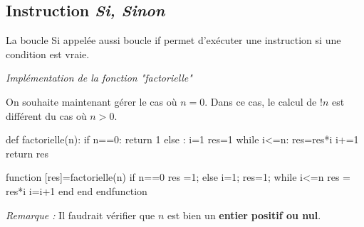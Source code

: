 \documentclass[11pt,oneside]{article}
\begin{document}
\subsection{Instruction \textsl{Si, Sinon}}

\begin{defi}
La boucle \textsf{Si} appelée aussi boucle \textsf{if} permet d'exécuter une instruction si une condition est vraie.
\end{defi}


\begin{exemple}
\textit{Implémentation de la fonction "factorielle"}

On souhaite maintenant gérer le cas où $n=0$. Dans ce cas, le calcul de $!n$ est différent du cas où $n>0$.

\begin{minipage}[c]{.35\linewidth}
\begin{pseudo}
\begin{algorithm}[H]
\end{algorithm}
\end{pseudo}
\end{minipage}\hfill
\begin{minipage}[c]{.3\linewidth}
\begin{py}
\begin{python}
def factorielle(n):
    if n==0:
        return 1
    else :
        i=1    
        res=1
        while i<=n:
            res=res*i
            i+=1
        return res
\end{python}
\end{py}
\end{minipage}\hfill
\begin{minipage}[c]{.3\linewidth}
\begin{sci}
\begin{scilab}
function [res]=factorielle(n)
  if n==0
    res =1;
  else
    i=1;
    res=1;
    while i<=n
      res = res*i
      i=i+1
    end
  end  
endfunction
\end{scilab}
\end{sci}
\end{minipage}

\textit{Remarque :} Il faudrait vérifier que $n$ est bien un \textbf{entier} \textbf{positif ou nul}.
\end{exemple}
\end{document}
